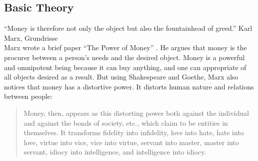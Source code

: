 \documentclass[10pt, letterpaper]{article}
\begin{document}
\begin{spacing}{1.8}
\section{Basic Theory}

\noindent``Money is therefore not only the object but also the fountainhead of greed.'' Karl Marx, Grundrisse\\
 


%

Marx wrote a brief paper ``The Power of Money'' \citep{marx1844-powerOfMoney}. He argues that money is the procurer between a person's needs and the desired object. Money is a powerful and omnipotent being because it can buy anything, and one can appropriate of all objects desired as a result.
But using Shakespeare and Goethe, Marx also notices that money has a distortive power. It distorts human nature and relations between people:
\begin{quote}
Money, then, appears as this distorting power both against the individual and against the bonds of society, etc., which claim to be entities in themselves. It transforms fidelity into infidelity, love into hate, hate into love, virtue into vice, vice into virtue, servant into master, master into servant, idiocy into intelligence, and intelligence into idiocy.


\end{quote}
\end{spacing}
\end{document}

